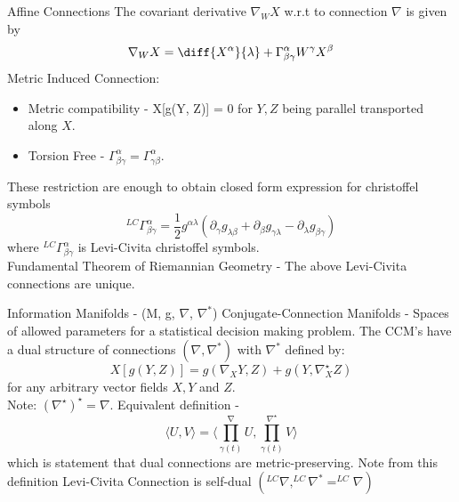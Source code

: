 \documentclass{beamer}
\begin{document}
\begin{frame}{Affine Connections}
    The covariant derivative $\nabla_{W}X$ w.r.t to connection $\nabla$ is given by
    \begin{equation*}
        \nabla_{W}X = \diff{X^{\alpha}}{\lambda} + \Gamma^{\alpha}_{\beta\gamma}W^{\gamma}X^{\beta}
    \end{equation*}
    Metric Induced Connection:
    \begin{itemize}
        \item Metric compatibility - X[g(Y, Z)] = 0 for $Y, Z$ being parallel transported along $X$.
        \item Torsion Free - $\Gamma^{\alpha}_{\beta\gamma} = \Gamma^{\alpha}_{\gamma\beta}$. 
    \end{itemize} These restriction are enough to obtain closed form expression for christoffel symbols 
    \begin{equation*}
        ^{LC}\Gamma^{\alpha}_{\beta\gamma} = \frac{1}{2}g^{\alpha\lambda}(\partial_{\gamma}g_{\lambda\beta} + \partial_{\beta}g_{\gamma\lambda} -\partial_{\lambda}g_{\beta\gamma})
    \end{equation*} where $^{LC}\Gamma^{\alpha}_{\beta\gamma}$ is Levi-Civita christoffel symbols. \\
    \vspace{5mm}
    Fundamental Theorem of Riemannian Geometry - The above Levi-Civita connections are unique.
\end{frame}
\begin{frame}{Information Manifolds - (M, g, $\nabla$, $\nabla^{\ast}$)}
    Conjugate-Connection Manifolds - Spaces of allowed parameters for a statistical decision making problem. The CCM's have a dual structure of connections $(\nabla, \nabla^{\ast})$ with $\nabla^{\ast}$ defined by:
    \begin{equation*}
        X[g(Y,Z)] = g(\nabla_{X} Y, Z) + g(Y, \nabla^{\star}_{X} Z)
    \end{equation*} for any arbitrary vector fields $X, Y$ and $Z$. \\
    \vspace{5mm}
    Note: $(\nabla^{\star})^{\star} = \nabla$.
    Equivalent definition - 
    \begin{equation*}
        \langle U, V\rangle = \langle \prod^{\nabla}_{\gamma(t)}U, \prod^{\nabla^{\star}}_{\gamma(t)}V\rangle
    \end{equation*} which is statement that dual connections are metric-preserving. Note from this definition Levi-Civita Connection is self-dual $(^{LC}\nabla, ^{LC}\nabla^{\ast} = ^{LC}\nabla)$
\end{frame}
\end{document}
